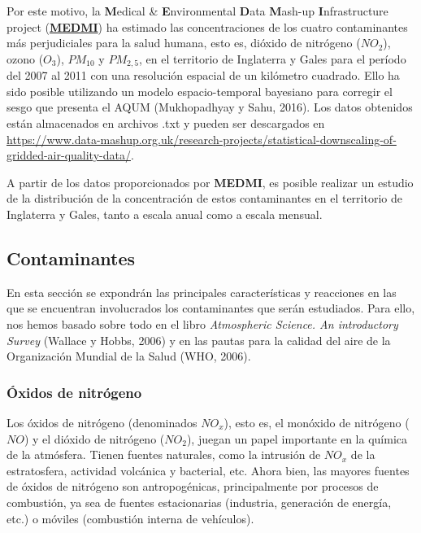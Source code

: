 \documentclass[12pt]{article}
\begin{document}
Por este motivo, la \textbf{M}edical \& \textbf{E}nvironmental \textbf{D}ata \textbf{M}ash-up \textbf{I}nfrastructure project (\href{https://www.data-mashup.org.uk/}{\textbf{MEDMI}}) ha estimado las concentraciones de los cuatro contaminantes más perjudiciales para la salud humana, esto es, dióxido de nitrógeno ($NO_{2}$), ozono ($O_{3}$), $PM_{10}$ y $PM_{2,5}$, en el territorio de Inglaterra y Gales para el período del 2007 al 2011 con una resolución espacial de un kilómetro cuadrado. Ello ha sido posible utilizando un modelo espacio-temporal bayesiano para corregir el sesgo que presenta el AQUM (Mukhopadhyay y Sahu, 2016). Los datos obtenidos están almacenados en archivos .txt y pueden ser descargados en \href{https://www.data-mashup.org.uk/research-projects/statistical-downscaling-of-gridded-air-quality-data/}{https://www.data-mashup.org.uk/research-projects/statistical-downscaling-of-gridded-air-quality-data/}.

A partir de los datos proporcionados por \textbf{MEDMI}, es posible realizar un estudio de la distribución de la concentración de estos contaminantes en el territorio de Inglaterra y Gales, tanto a escala anual como a escala mensual.

\subsection{Contaminantes}

En esta sección se expondrán las principales características y reacciones en las que se encuentran involucrados los contaminantes que serán estudiados. Para ello, nos hemos basado sobre todo en el libro \textit{Atmospheric Science. An introductory Survey} (Wallace y Hobbs, 2006) y en las pautas para la calidad del aire de la Organización Mundial de la Salud (WHO, 2006).

\subsubsection{Óxidos de nitrógeno}

Los óxidos de nitrógeno (denominados $NO_{x}$), esto es, el monóxido de nitrógeno ($NO$) y el dióxido de nitrógeno ($NO_{2}$), juegan un papel importante en la química de la atmósfera. Tienen fuentes naturales, como la intrusión de $NO_{x}$ de la estratosfera, actividad volcánica y bacterial, etc. Ahora bien, las mayores fuentes de óxidos de nitrógeno son antropogénicas, principalmente por procesos de combustión, ya sea de fuentes estacionarias (industria, generación de energía, etc.) o móviles (combustión interna de vehículos).
\end{document}
